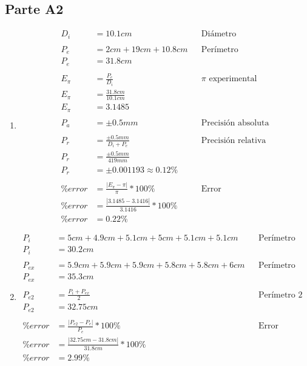 \subsection{Parte A2}%
\label{sub:proce_parte_a2}

\begin{enumerate}
	\item
		\begin{align*}
			D_i &= 10.1cm && \text{Diámetro}\\
			\\
			P_e  &= 2cm+19cm+10.8cm && \text{Perímetro}\\
			P_e &= 31.8cm\\
			\\
			E_\pi &= \frac{P_e}{D_i} && \text{$\pi$ experimental}\\
			E_\pi &= \frac{31.8cm}{10.1cm} \\
			E_\pi &= 3.1485 \\
			\\
			P_a &= \pm0.5mm && \text{Precisión absoluta}\\
			\\
			P_r &= \frac{\pm0.5mm}{D_i+P_e} && \text{Precisión relativa}\\
			P_r &= \frac{\pm0.5mm}{419mm} \\
			P_r &= \pm0.001193 \approx 0.12\%\\
			\\
			\%error &= \frac{|E_\pi-\pi|}{\pi} * 100\% && \text{Error}\\
			\%error &= \frac{|3.1485-3.1416|}{3.1416} * 100\%\\
			\%error &= 0.22\%
		\end{align*}
	\item
		\begin{align*}
			P_i &= 5cm+4.9cm+5.1cm+5cm+5.1cm+5.1cm && \text{Perímetro interior}\\
			P_i &= 30.2cm\\
			\\
			P_{ex} &= 5.9cm+5.9cm+5.9cm+5.8cm+5.8cm+6cm && \text{Perímetro exterior}\\
			P_{ex} &= 35.3cm\\
			\\
			P_{e2} &= \frac{P_i+P_{ex}}{2} && \text{Perímetro 2}\\
			P_{e2} &= 32.75cm\\
			\\
			\%error &= \frac{|P_{e2}-P_e|}{P_e}  * 100\% && \text{Error}\\
			\%error &= \frac{|32.75cm-31.8cm|}{31.8cm}  * 100\% \\
			\%error &= 2.99\%
		\end{align*}
\end{enumerate}

